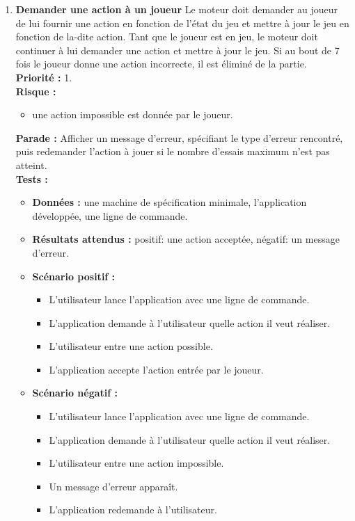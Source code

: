 \documentclass{article}
\begin{document}
\begin{enumerate}
    \item \textbf{Demander une action à un joueur}
    Le moteur doit demander au joueur de lui fournir une action en fonction de l'état du jeu et mettre à jour le jeu en fonction de la-dite action. Tant que le joueur est en jeu, le moteur doit continuer à lui demander une action et mettre à jour le jeu. Si au bout de 7 fois le joueur donne une action incorrecte, il est éliminé de la partie.\\ 
    \textbf{Priorité :} 1. \\
    \textbf{Risque :} 
    \begin{itemize}
        \item une action impossible est donnée par le joueur.
    \end{itemize}
    \textbf{Parade :} Afficher un message d'erreur, spécifiant le type d'erreur rencontré, puis redemander l'action à jouer si le nombre d'essais maximum n'est pas atteint.\\
    \textbf{Tests :}
    \begin{itemize}
        \item \textbf{Données :} une machine de spécification minimale, l'application développée, une ligne de commande.
        \item \textbf{Résultats attendus :} positif: une action acceptée, négatif: un message d'erreur.
        \item \textbf{Scénario positif :}
        \begin{itemize}
            \item L'utilisateur lance l'application avec une ligne de commande.
            \item L'application demande à l'utilisateur quelle action il veut réaliser.
            \item L'utilisateur entre une action possible.
            \item L'application accepte l'action entrée par le joueur.
        \end{itemize}
        \item \textbf{Scénario négatif :}
        \begin{itemize}
            \item L'utilisateur lance l'application avec une ligne de commande.
            \item L'application demande à l'utilisateur quelle action il veut réaliser.
            \item L'utilisateur entre une action impossible.
            \item Un message d'erreur apparaît.
            \item L'application redemande à l'utilisateur.
        \end{itemize}
    \end{itemize}
    

\end{enumerate}
\end{document}
